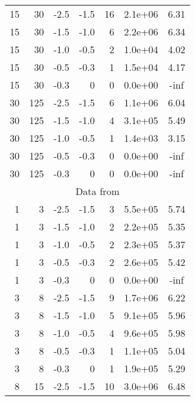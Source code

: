 \documentclass[12pt, a4paper]{article}
\begin{document}
{\begin{table}[ht!]
\begin{tabular}{rrrrrrc}
        \hline
        15     & 30     & -2.5   & -1.5   & 16     & 2.1e+06 & 6.31       \\
        15     & 30     & -1.5   & -1.0   & 6      & 2.2e+06 & 6.34       \\
        15     & 30     & -1.0   & -0.5   & 2      & 1.0e+04 & 4.02       \\
        15     & 30     & -0.5   & -0.3   & 1      & 1.5e+04 & 4.17       \\
        15     & 30     & -0.3   & 0      & 0      & 0.0e+00 & -inf       \\
        \hline
        30     & 125    & -2.5   & -1.5   & 6      & 1.1e+06 & 6.04       \\
        30     & 125    & -1.5   & -1.0   & 4      & 3.1e+05 & 5.49       \\
        30     & 125    & -1.0   & -0.5   & 1      & 1.4e+03 & 3.15       \\
        30     & 125    & -0.5   & -0.3   & 0      & 0.0e+00 & -inf       \\
        30     & 125    & -0.3   & 0      & 0      & 0.0e+00 & -inf       \\
        \hline
        \multicolumn{7}{c}{Data from \citet[][55 GCs]{2013ApJ...775..134V}} \\
        \hline
        1      & 3      & -2.5   & -1.5   & 3      & 5.5e+05 & 5.74       \\
        1      & 3      & -1.5   & -1.0   & 2      & 2.2e+05 & 5.35       \\
        1      & 3      & -1.0   & -0.5   & 2      & 2.3e+05 & 5.37       \\
        1      & 3      & -0.5   & -0.3   & 2      & 2.6e+05 & 5.42       \\
        1      & 3      & -0.3   & 0      & 0      & 0.0e+00 & -inf       \\
        \hline
        3      & 8      & -2.5   & -1.5   & 9      & 1.7e+06 & 6.22       \\
        3      & 8      & -1.5   & -1.0   & 5      & 9.1e+05 & 5.96       \\
        3      & 8      & -1.0   & -0.5   & 4      & 9.6e+05 & 5.98       \\
        3      & 8      & -0.5   & -0.3   & 1      & 1.1e+05 & 5.04       \\
        3      & 8      & -0.3   & 0      & 1      & 1.9e+05 & 5.29       \\
        \hline
        8      & 15     & -2.5   & -1.5   & 10     & 3.0e+06 & 6.48       \\

\end{tabular}
\end{table}}
\end{document}
